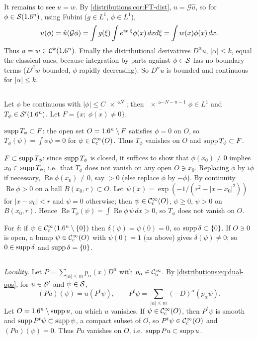 It remains to see $u=w$. By \cref{distributions:cor:FT-dist}, $u=\mathcal{G}\hat u$, so
for $\phi\in\mathcal{S}(1.6^n)$, using Fubini ($g\in L^1$, $\phi\in L^1$),
\[
  u(\phi)=\hat u(\mathcal{G}\phi)=\int g(\xi)\int e^{ix\cdot\xi}\phi(x)\,dx\,\dbar\xi
  =\int w(x)\phi(x)\,dx .
\]
Thus $u=w\in\mathcal{C}^k(1.6^n)$. Finally the distributional derivatives $D^\alpha u$,
$|\alpha|\le k$, equal the classical ones, because integration by parts against
$\phi\in\mathcal{S}$ has no boundary terms ($D^\beta w$ bounded, $\phi$ rapidly decreasing). So
$D^\alpha u$ is bounded and continuous for $|\alpha|\le k$.

\subsection*{}
Let $\phi$ be continuous with $|\phi|\le C\ang{x}^N$; then $\ang{x}^{-N-n-1}\phi\in L^1$
and $T_\phi\in\mathcal{S}'(1.6^n)$. Let $F=\overline{\{x;\ \phi(x)\neq0\}}$.

$\operatorname{supp} T_\phi\subset F$: the open set $O=1.6^n\setminus F$ satisfies $\phi=0$ on $O$, so
$T_\phi(\psi)=\int\phi\psi=0$ for $\psi\in\mathcal{C}^\infty_{\mathrm{c}}(O)$. Thus $T_\phi$ vanishes on $O$ and
$\operatorname{supp} T_\phi\subset F$.

$F\subset\operatorname{supp} T_\phi$: since $\operatorname{supp} T_\phi$ is closed, it suffices to show that
$\phi(x_0)\neq0$ implies $x_0\in\operatorname{supp} T_\phi$, i.e.\ that $T_\phi$ does not vanish on any
open $O\ni x_0$. Replacing $\phi$ by $i\phi$ if necessary, $\operatorname{Re}\phi(x_0)\neq0$,
say $>0$ (else replace $\phi$ by $-\phi$). By continuity $\operatorname{Re}\phi>0$ on a
ball $B(x_0,r)\subset O$. Let $\psi(x)=\exp(-1/(r^2-|x-x_0|^2))$ for $|x-x_0|<r$ and
$\psi=0$ otherwise; then $\psi\in\mathcal{C}^\infty_{\mathrm{c}}(O)$, $\psi\ge0$, $\psi>0$ on $B(x_0,r)$. Hence
$\operatorname{Re}T_\phi(\psi)=\int\operatorname{Re}\phi\,\psi\,dx>0$, so $T_\phi$ does not vanish on $O$.

For $\delta$: if $\psi\in\mathcal{C}^\infty_{\mathrm{c}}(1.6^n\setminus\{0\})$ then $\delta(\psi)=\psi(0)=0$, so
$\operatorname{supp}\delta\subset\{0\}$. If $O\ni0$ is open, a bump $\psi\in\mathcal{C}^\infty_{\mathrm{c}}(O)$ with $\psi(0)=1$
(as above) gives $\delta(\psi)\ne0$; so $0\in\operatorname{supp}\delta$ and $\operatorname{supp}\delta=\{0\}$.

\subsection*{}
\emph{Locality.} Let $P=\sum_{|\alpha|\le m}p_\alpha(x)D^\alpha$ with $p_\alpha\in\mathcal{C}^\infty_{\mathrm{b}}$.
By \eqref{distributions:eq:dual-ops}, for $u\in\mathcal{S}'$ and $\psi\in\mathcal{S}$,
\[
  (Pu)(\psi)=u(P^t\psi),\qquad P^t\psi=\sum_{|\alpha|\le m}(-D)^\alpha(p_\alpha\psi).
\]
Let $O=1.6^n\setminus\operatorname{supp} u$, on which $u$ vanishes. If $\psi\in\mathcal{C}^\infty_{\mathrm{c}}(O)$, then
$P^t\psi$ is smooth and $\operatorname{supp} P^t\psi\subset\operatorname{supp}\psi$, a compact subset of $O$, so
$P^t\psi\in\mathcal{C}^\infty_{\mathrm{c}}(O)$ and $(Pu)(\psi)=0$. Thus $Pu$ vanishes on $O$, i.e.\
$\operatorname{supp} Pu\subset\operatorname{supp} u$.

